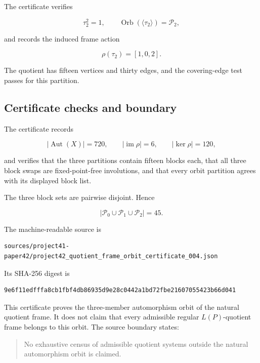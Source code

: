 The certificate verifies

\[
\tau_2^2=1,
\qquad
\operatorname{Orb}(\langle\tau_2\rangle)
=
\mathcal P_2,
\]

and records the induced frame action

\[
\rho(\tau_2)
=
[1, 0, 2].
\]

The quotient has fifteen vertices and thirty edges, and the covering-edge
test passes for this partition.

\subsection{Certificate checks and boundary}

The certificate records

\[
|\operatorname{Aut}(X)|=720,
\qquad
|\operatorname{im}\rho|=6,
\qquad
|\ker\rho|=120,
\]

and verifies that the three partitions contain fifteen blocks each, that
all three block swaps are fixed-point-free involutions, and that every
orbit partition agrees with its displayed block list.

The three block sets are pairwise disjoint. Hence

\[
\left|
\mathcal P_0
\cup
\mathcal P_1
\cup
\mathcal P_2
\right|
=
45.
\]

The machine-readable source is

\begin{verbatim}
sources/project41-paper42/project42_quotient_frame_orbit_certificate_004.json
\end{verbatim}

Its SHA-256 digest is

\begin{verbatim}
9e6f11edfffa8cb1fbf4db86935d9e28c0442a1bd72fbe21607055423b66d041
\end{verbatim}

This certificate proves the three-member automorphism orbit of the
natural quotient frame. It does not claim that every admissible regular
\(L(P)\)-quotient frame belongs to this orbit. The source boundary states:

\begin{quote}
No exhaustive census of admissible quotient systems outside the natural automorphism orbit is claimed.
\end{quote}

